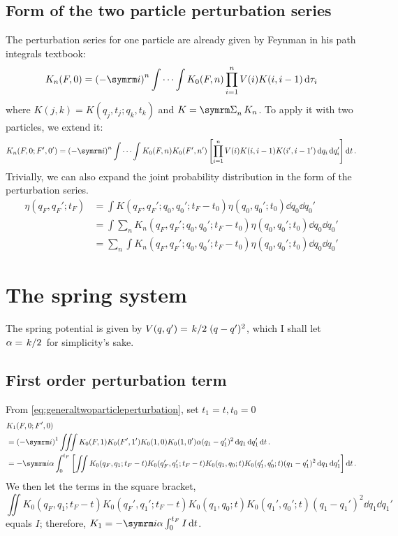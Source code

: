 \subsection{Form of the two particle perturbation series}

The perturbation series for one particle are already given by Feynman in his path integrals textbook:
\begin{equation}
    K_n(F, 0) = \left(-\im\right)^n\idotsint K_0(F, n)\prod_{i = 1}^n V(i)K(i, i - 1)\dd{\tau_i}
\end{equation}
where $K(j, k) = K(q_j, t_j; q_k, t_k)$ and $K = \ssum_nK_n$. To apply it with two particles, we extend it:
\begin{equation}
    K_n(F, 0; F', 0') = \left(-\im\right)^n\idotsint K_0(F, n)K_0(F', n')\left[\prod_{i = 1}^nV(i)K(i, i - 1)K(i', i - 1')\dd{q_i}\dd{q_i'}\right]\dd{t}. \label{eq:generaltwoparticleperturbation}
\end{equation}
Trivially, we can also expand the joint probability distribution in the form of the perturbation series.
\begin{align}
    \eta(q_F, q_F'; t_F) &= \int K(q_F, q_F'; q_0, q_0'; t_F - t_0)\eta(q_0, q_0'; t_0)\dd{q_0}\dd{q_0'} \\
    &= \int \sum_n K_n(q_F, q_F'; q_0, q_0'; t_F - t_0)\eta(q_0, q_0'; t_0) \dd{q_0}\dd{q_0'} \\
    &= \sum_n \int K_n(q_F, q_F'; q_0, q_0'; t_F - t_0)\eta(q_0, q_0'; t_0) \dd{q_0}\dd{q_0'}
\end{align}

\section{The spring system}

The spring potential is given by $V(q, q') = \flatfrac{k}{2}(q - q')^2$, which I shall let $\alpha = \flatfrac{k}{2}$ for simplicity’s sake.

\subsection{First order perturbation term}
\label{sec:spring_1storder}

From \cref{eq:generaltwoparticleperturbation}, set $t_1 = t, t_0 = 0$
\begin{align}
    &K_1(F, 0; F', 0) \nonumber \\
    &= \left(-\im\right)^1\iiint K_0(F, 1)K_0(F', 1')K_0(1, 0)K_0(1, 0')\alpha(q_1 - q_1')^2\dd{q_1}\dd{q_1'}\dd{t}. \\
    &= -\im\alpha\int_0^{t_F}\left[\iint K_0(q_F, q_1; t_F - t)K_0(q_F', q_1'; t_F - t)K_0(q_1, q_0; t)K_0(q_1', q_0'; t)(q_1 - q_1')^2\dd{q_1}\dd{q_1'}\right]\dd{t}. \nonumber
\end{align}
We then let the terms in the square bracket,
\begin{equation}
    \iint K_0(q_F, q_1; t_F - t)K_0(q_F', q_1'; t_F - t)K_0(q_1, q_0; t)K_0(q_1', q_0'; t)(q_1 - q_1')^2\dd{q_1}\dd{q_1'}
\end{equation}
equals $I$; therefore, $K_1 = -\im\alpha\int_0^{t_F} I\dd{t}$.

